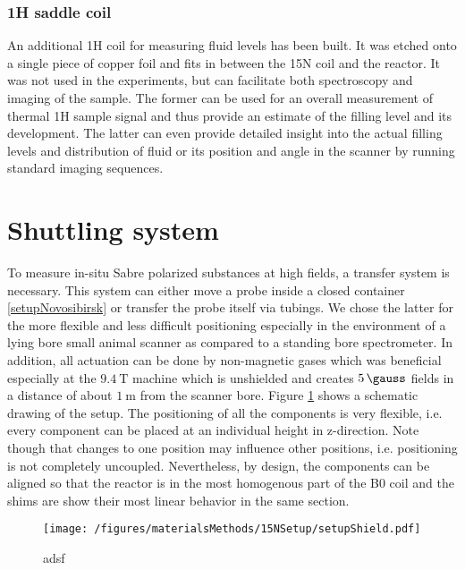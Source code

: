             \subsubsection{1H saddle coil} 
            An additional 1H coil for measuring fluid levels has been built. It was etched onto a single piece of copper foil and fits in between the 15N coil and the reactor. It was not used in the experiments, but can facilitate both spectroscopy and imaging of the sample. The former can be used for an overall measurement of thermal 1H sample signal and thus provide an estimate of the filling level and its development. The latter can even provide detailed insight into the actual filling levels and distribution of fluid or its position and angle in the scanner by running standard imaging sequences.
    \section{Shuttling system}\label{sec:shuttlingSystem}
    To measure in-situ Sabre polarized substances at high fields, a transfer system is necessary. This system can either move a probe inside a closed container \ref{setupNovosibirsk} or transfer the probe itself via tubings. We chose the latter for the more flexible and less difficult positioning especially in the environment of a lying bore small animal scanner as compared to a standing bore spectrometer. In addition, all actuation can be done by non-magnetic gases which was beneficial especially at the $\SI{9.4}{\tesla}$ machine which is unshielded and creates $\SI{5}{\gauss}$ fields in a distance of about $\SI{1}{\meter}$ from the scanner bore. Figure \ref{figure:materialsMethods:shields15N} shows a schematic drawing of the setup. The positioning of all the components is very flexible, i.e. every component can be placed at an individual height in z-direction. Note though that changes to one position may influence other positions, i.e. positioning is not completely uncoupled. Nevertheless, by design, the components can be aligned so that the reactor is in the most homogenous part of the B0 coil and the shims are show their most linear behavior in the same section.
        \begin{figure}
            \texttt{[image: /figures/materialsMethods/15NSetup/setupShield.pdf]}
            \caption[Shuttling system shields]{adsf}
            \label{figure:materialsMethods:shields15N}
        \end{figure}
